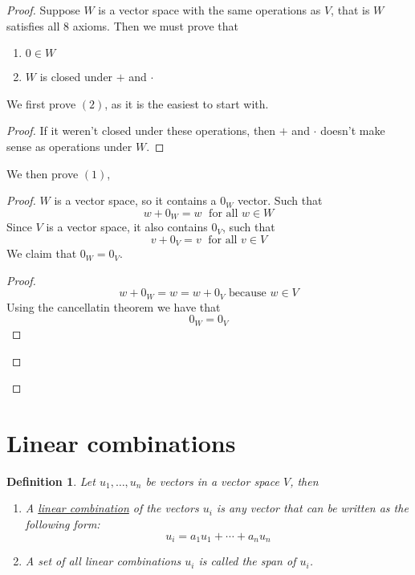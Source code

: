 \documentclass{article}
\newtheorem{definition}[theorem]{Definition}
\newtheorem{one minute paper}[theorem]{One Minute Paper}
\begin{document}
\begin{proof}
    Suppose $W$ is a vector space with the same operations as $V$, that is $W$ satisfies all 8 axioms. Then we must prove that
    \begin{enumerate}
        \item $0 \in W$
        \item $W$ is closed under $+$ and $\cdot$
    \end{enumerate}
    We first prove $(2)$, as it is the easiest to start with. 
    \begin{proof}
        If it weren't closed under these operations, then $+$ and $\cdot$ doesn't make sense as operations under $W$. 
    \end{proof}
    We then prove $(1)$, 
    \begin{proof}
        $W$ is a vector space, so it contains a $0_W$ vector. Such that
        \begin{equation}
            w + 0_W = w \; \text{ for all } w \in W
        \end{equation} 
        Since $V$ is a vector space, it also contains $0_V$, such that
        \begin{equation}
            v + 0_V = v \; \text{ for all } v \in V
        \end{equation}
        We claim that $0_W = 0_V$. 
        \begin{proof}
            \begin{equation}
                w + 0_W = w = w + 0_V \text{ because } w \in V
            \end{equation}
            Using the cancellatin theorem we have that 
            \begin{equation}
                0_W = 0_V
            \end{equation}
        \end{proof}
    \end{proof}
\end{proof}

\newpage

\section*{Linear combinations}

\begin{definition}
    Let $u_1, \dots, u_n$ be vectors in a vector space $V$, then 
    \begin{enumerate}
        \item A \underline{linear combination} of the vectors $u_i$ is any vector that can be written as the following form:
        \begin{equation}
            u_i = a_1u_1 + \cdots + a_n u_n
        \end{equation}
        \item A set of all linear combinations $u_i$ is called the span of $u_i$. 
    \end{enumerate}
\end{definition}
\end{document}
